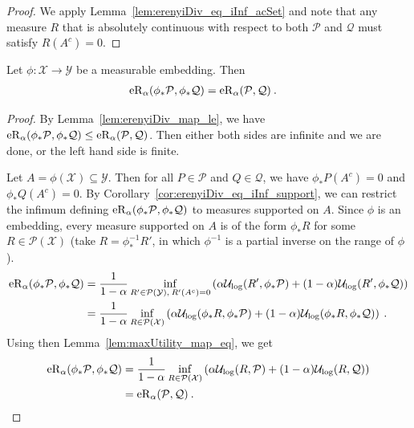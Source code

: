 \begin{proof}
We apply Lemma~\ref{lem:erenyiDiv_eq_iInf_acSet} and note that any measure $R$ that is absolutely continuous with respect to both $\mathcal{P}$ and $\mathcal{Q}$ must satisfy $R(A^c) = 0$.
\end{proof}


\begin{lemma}\label{lem:erenyiDiv_map_eq}
Let $\phi : \mathcal{X} \to \mathcal{Y}$ be a measurable embedding. Then
\begin{align*}
  \operatorname{eR}_\alpha(\phi_*\mathcal{P}, \phi_*\mathcal{Q})
  &= \operatorname{eR}_\alpha(\mathcal{P}, \mathcal{Q})
  \: .
\end{align*}
\end{lemma}

\begin{proof}
By Lemma~\ref{lem:erenyiDiv_map_le}, we have $\operatorname{eR}_\alpha(\phi_*\mathcal{P}, \phi_*\mathcal{Q}) \le \operatorname{eR}_\alpha(\mathcal{P}, \mathcal{Q})$.
Then either both sides are infinite and we are done, or the left hand side is finite.

Let $A = \phi(\mathcal{X}) \subseteq \mathcal{Y}$.
Then for all $P \in \mathcal{P}$ and $Q \in \mathcal{Q}$, we have $\phi_* P(A^c) = 0$ and $\phi_* Q(A^c) = 0$.
By Corollary~\ref{cor:erenyiDiv_eq_iInf_support}, we can restrict the infimum defining $\operatorname{eR}_\alpha(\phi_*\mathcal{P}, \phi_*\mathcal{Q})$ to measures supported on $A$.
Since $\phi$ is an embedding, every measure supported on $A$ is of the form $\phi_* R$ for some $R \in \mathcal{P}(\mathcal{X})$ (take $R = \phi^{-1}_* R'$, in which $\phi^{-1}$ is a partial inverse on the range of $\phi$).
\begin{align*}
  \operatorname{eR}_\alpha(\phi_*\mathcal{P}, \phi_*\mathcal{Q})
  &= \frac{1}{1 - \alpha} \inf_{R' \in \mathcal{P}(\mathcal{Y}), \: R'(A^c) = 0} \left( \alpha \mathcal{U}_{\log}(R', \phi_* \mathcal{P}) + (1 - \alpha) \mathcal{U}_{\log}(R', \phi_* \mathcal{Q}) \right)
  \\
  &= \frac{1}{1 - \alpha} \inf_{R \in \mathcal{P}(\mathcal{X})} \left( \alpha \mathcal{U}_{\log}(\phi_* R, \phi_* \mathcal{P}) + (1 - \alpha) \mathcal{U}_{\log}(\phi_* R, \phi_* \mathcal{Q}) \right)
  \: .
\end{align*}
Using then Lemma~\ref{lem:maxUtility_map_eq}, we get
\begin{align*}
  \operatorname{eR}_\alpha(\phi_*\mathcal{P}, \phi_*\mathcal{Q})
  &= \frac{1}{1 - \alpha} \inf_{R \in \mathcal{P}(\mathcal{X})} \left( \alpha \mathcal{U}_{\log}(R, \mathcal{P}) + (1 - \alpha) \mathcal{U}_{\log}(R, \mathcal{Q}) \right)
  \\
  &= \operatorname{eR}_\alpha(\mathcal{P}, \mathcal{Q})
  \: .
\end{align*}
\end{proof}


